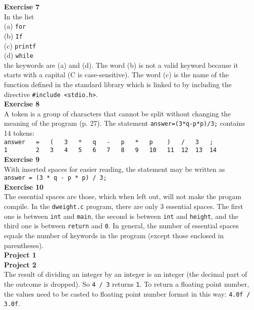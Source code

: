 \documentclass[a4paper, 10pt]{article}
\begin{document}
\textbf{Exercise 7} \\
In the list \\
(a) \texttt{for} \\
(b) \texttt{If} \\
(c) \texttt{printf} \\
(d) \texttt{while} \\
the keywords are (a) and (d). The word (b) is not a valid keyword because it starts with a capital (C is case-sensitive). The word (c) is the name of the function defined in the standard library which is linked to by including the directive \texttt{\#include <stdio.h>}. \\

\textbf{Exercise 8} \\
A token is a group of characters that cannot be split without changing the meaning of the program (p. 27). The statement \texttt{answer=(3*q-p*p)/3;} contains 14 tokens:\\
\texttt{answer ~~= ~~( ~~3 ~~* ~~q ~~- ~~p  ~~* ~~p ~~~) ~~/ ~~3 ~~;}\\
\texttt{1 ~~~~~~~2 ~~3 ~~4 ~~5 ~~6 ~~7 ~~8  ~~9 ~~10 ~~11 ~12 ~13 ~14}\\ 

\textbf{Exercise 9} \\
With inserted spaces for easier reading, the statement may be written as \\
\texttt{answer = (3 * q - p * p) / 3;}\\

\textbf{Exercise 10} \\
The essential spaces are those, which when left out, will not make the progam compile. In the \texttt{dweight.c}  program, there are only 3 essential spaces. The first one is between \texttt{int} and \texttt{main}, the second is between \texttt{int} and \texttt{height}, and the third one is between \texttt{return} and \texttt{0}. In general, the number of essential spaces equals the number of keywords in the program (except those enclosed in parentheses). \\

\textbf{Project 1} \\


\textbf{Project 2} \\


The result of dividing an integer by an integer is an integer (the decimal part of the outcome is dropped). So \texttt{4 / 3} returns \texttt{1}. To return a floating point number, the values need to be casted to floating point number format in this way: \texttt{4.0f / 3.0f}.\\
\end{document}
